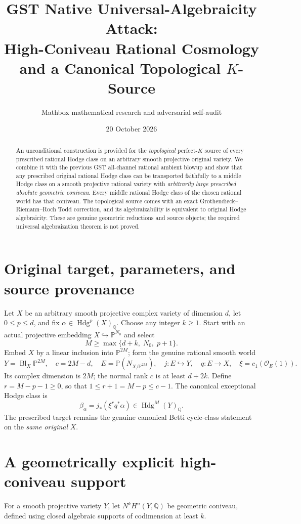 \documentclass[11pt]{article}
\title{GST Native Universal-Algebraicity Attack:\\
High-Coniveau Rational Cosmology and a Canonical Topological \(K\)-Source}
\author{Mathbox mathematical research and adversarial self-audit}
\date{20 October 2026}
\newcommand{\Q}{\mathbb Q}
\newcommand{\Hdg}{\operatorname{Hdg}}
\begin{document}
\maketitle
\begin{abstract}
An unconditional construction is provided for the \emph{topological}
perfect-\(K\) source of every prescribed rational Hodge class on an
arbitrary smooth projective original variety. We combine it with the
previous GST all-channel rational ambient blowup and show that any
prescribed original rational Hodge class can be transported faithfully
to a middle Hodge class on a smooth projective rational variety
with \emph{arbitrarily large prescribed absolute geometric coniveau}.
Every middle rational Hodge class of the chosen rational world has
that coniveau. The topological source comes with an exact
Grothendieck--Riemann--Roch Todd correction, and its algebraizability
is equivalent to original Hodge algebraicity. These are genuine
geometric reductions and source objects; the required universal
algebraization theorem is not proved.
\end{abstract}

\section{Original target, parameters, and source provenance}
Let \(X\) be an arbitrary smooth projective complex variety of
dimension \(d\), let \(0\le p\le d\), and fix
\(\alpha\in\Hdg^p(X)_{\Q}\).
Choose any integer \(k\ge1\). Start with an actual
projective embedding \(X\hookrightarrow\mathbb P^{N_0}\)
and select
\[
 M\ge \max\{d+k,\;N_0,\;p+1\}. \tag{1.1}
\]
Embed \(X\) by a linear inclusion into \(\mathbb P^{2M}\);
form the genuine rational smooth world
\[
 Y=\operatorname{Bl}_X\mathbb P^{2M},\quad
 c=2M-d,\quad
 E=\mathbb P(N_{X/\mathbb P^{2M}}),\quad
 j:E\hookrightarrow Y,\quad q:E\to X,
 \quad\xi=c_1(\mathcal O_E(1)).
\]
Its complex dimension is \(2M\); the normal rank \(c\)
is at least \(d+2k\). Define
\(r=M-p-1\ge0\), so that \(1\le r+1=M-p\le c-1\).
The canonical exceptional Hodge class is
\[
 \boxed{\beta_{\alpha}=j_*(\xi^r q^*\alpha)
       \in \Hdg^M(Y)_{\Q}.} \tag{1.2}
\]
The prescribed target remains the genuine canonical Betti
cycle-class statement on the \emph{same original} \(X\).

\section{A geometrically explicit high-coniveau support}
For a smooth projective variety \(Y\), let
\(N^kH^n(Y,\Q)\) be geometric coniveau, defined using
closed algebraic supports of codimension at least \(k\).
\end{document}
